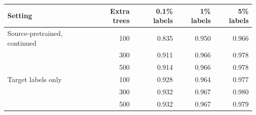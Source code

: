 \begin{tabular}{lrrrr}
\toprule
Setting & Extra trees & 0.1\% labels & 1\% labels & 5\% labels \\
\midrule
Source-pretrained, continued & 100 & 0.835 & 0.950 & 0.966 \\
 & 300 & 0.911 & 0.966 & 0.978 \\
 & 500 & 0.914 & 0.966 & 0.978 \\
Target labels only & 100 & 0.928 & 0.964 & 0.977 \\
 & 300 & 0.932 & 0.967 & 0.980 \\
 & 500 & 0.932 & 0.967 & 0.979 \\
\bottomrule
\end{tabular}
